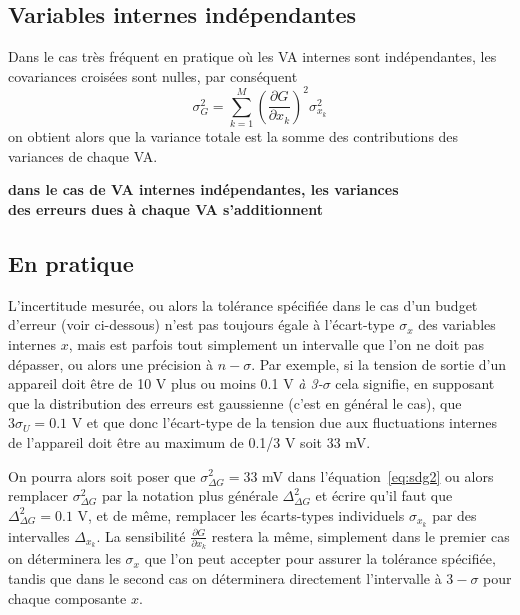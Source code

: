 \subsection{Variables internes indépendantes}

Dans le cas très fréquent en pratique où les VA internes sont indépendantes, les covariances croisées sont nulles, par conséquent
\begin{equation}
\sigma^2_G=\sum\limits_{k=1}^{M}\left(\frac{\partial G}{\partial x_k}\right)^2\sigma_{x_k}^2
\label{eq:vardlcolvisd}
\end{equation}
on obtient alors que la variance totale est la somme des contributions des variances de chaque VA.
\begin{center}
\bf
dans le cas de VA internes indépendantes, les variances\\
des erreurs dues à chaque VA s'additionnent
\end{center}

\subsection{En pratique}

L'incertitude mesurée, ou alors la tolérance spécifiée dans le cas d'un budget d'erreur (voir ci-dessous) n'est pas toujours égale à l'écart-type $\sigma_x$ des variables internes $x$, mais est parfois tout simplement un intervalle que l'on ne doit pas dépasser, ou alors une précision à $n-\sigma$. Par exemple, si la tension de sortie d'un appareil doit être de 10 V plus ou moins 0.1 V \textit{à 3-$\sigma$} cela signifie, en supposant que la distribution des erreurs est gaussienne (c'est en général le cas), que $3\sigma_U=0.1$ V et que donc l'écart-type de la tension due aux fluctuations internes de l'appareil doit être au maximum de 0.1/3 V soit 33 mV.

On pourra alors soit poser que $\sigma^2_{\Delta G}=33$ mV dans l'équation~\ref{eq:sdg2} ou alors remplacer $\sigma^2_{\Delta G}$ par la notation plus générale $\Delta^2_{\Delta G}$ et écrire qu'il faut que $\Delta^2_{\Delta G}=0.1$ V, et de même, remplacer les écarts-types individuels $\sigma_{x_k}$ par des intervalles $\Delta_{x_k}$. La sensibilité $\frac{\partial G}{\partial x_k}$ restera la même, simplement dans le premier cas on déterminera les $\sigma_x$ que l'on peut accepter pour assurer la tolérance spécifiée, tandis que dans le second cas on déterminera directement l'intervalle à $3-\sigma$ pour chaque composante $x$.

